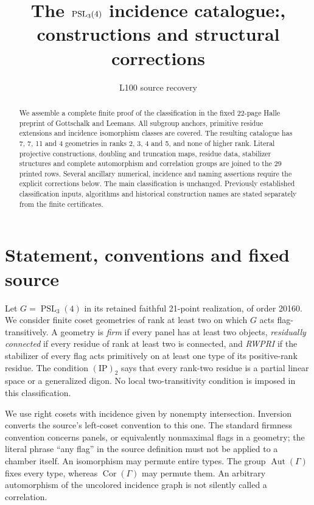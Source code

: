 \documentclass[11pt]{article}
\title{The $\PSL_3(4)$ incidence catalogue:\classification, constructions and structural corrections}
\author{L100 source recovery}\date{}
\newcommand{\Aut}{\operatorname{Aut}}\newcommand{\Cor}{\operatorname{Cor}}
\newcommand{\PSL}{\operatorname{PSL}}\newcommand{\PG}{\operatorname{PG}}
\newcommand{\ip}{\mathrm{(IP)}_2}
\begin{document}
\maketitle
\begin{abstract}
We assemble a complete finite proof of the classification in the fixed
22-page Halle preprint of Gottschalk and Leemans. All subgroup anchors,
primitive residue extensions and incidence isomorphism classes are covered.
The resulting catalogue has 7, 7, 11 and 4 geometries in ranks 2, 3, 4 and 5,
and none of higher rank. Literal projective constructions, doubling and
truncation maps, residue data, stabilizer structures and complete
automorphism and correlation groups are joined to the 29 printed rows.
Several ancillary numerical, incidence and naming assertions require
the explicit corrections below. The main classification is unchanged.
Previously established classification inputs, algorithms and historical
construction names are stated separately from the finite certificates.
\end{abstract}

\section{Statement, conventions and fixed source}
Let $G=\PSL_3(4)$ in its retained faithful 21-point realization, of order
20160. We consider finite coset geometries of rank at least two on which
$G$ acts flag-transitively. A geometry is \emph{firm} if every panel has
at least two objects, \emph{residually connected} if every residue of
rank at least two is connected, and \emph{RWPRI} if the stabilizer of
every flag acts primitively on at least one type of its positive-rank
residue. The condition $\ip$ says that every rank-two residue is a
partial linear space or a generalized digon. No local two-transitivity
condition is imposed in this classification.

We use right cosets with incidence given by nonempty intersection.
Inversion converts the source's left-coset convention to this one.
The standard firmness convention concerns panels, or equivalently
nonmaximal flags in a geometry; the literal phrase ``any flag'' in the
source definition must not be applied to a chamber itself. An isomorphism
may permute entire types. The group $\Aut(\Gamma)$ fixes every type,
whereas $\Cor(\Gamma)$ may permute them. An arbitrary automorphism of
the uncolored incidence graph is not silently called a correlation.
\end{document}
